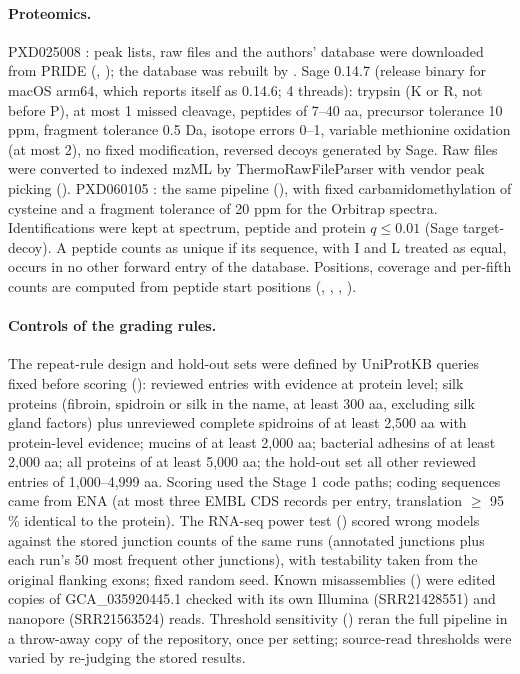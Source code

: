 \documentclass[11pt]{article}
\begin{document}
\paragraph{Proteomics.} PXD025008 \citep{kizina2022}: peak lists, raw files and the authors' database were downloaded
from PRIDE \citep{perezriverol2025} (, ); the database was rebuilt
by . Sage 0.14.7 \citep{lazear2023} (release binary for macOS arm64, which reports itself as
0.14.6; 4 threads): trypsin (K or R, not before P), at most 1 missed cleavage, peptides of 7--40 aa, precursor tolerance
10 ppm, fragment tolerance 0.5 Da, isotope errors 0--1, variable methionine oxidation (at most 2), no fixed modification,
reversed decoys generated by Sage. Raw files were converted to indexed mzML by ThermoRawFileParser \citep{hulstaert2020}
with vendor peak picking (). PXD060105 \citep{voigt2025}: the same pipeline
(), with fixed carbamidomethylation of cysteine and a fragment tolerance of 20 ppm for the Orbitrap
spectra. Identifications were kept at spectrum, peptide and protein $q \leq 0.01$ (Sage target-decoy). A peptide counts as
unique if its sequence, with I and L treated as equal, occurs in no other forward entry of the database. Positions,
coverage and per-fifth counts are computed from peptide start positions (,
, , ).

\paragraph{Controls of the grading rules.} The repeat-rule design and hold-out sets were defined by UniProtKB queries fixed
before scoring (): reviewed entries with evidence at protein level; silk proteins (fibroin, spidroin or silk
in the name, at least 300 aa, excluding silk gland factors) plus unreviewed complete spidroins of at least 2,500 aa with
protein-level evidence; mucins of at least 2,000 aa; bacterial adhesins of at least 2,000 aa; all proteins of at least
5,000 aa; the hold-out set all other reviewed entries of 1,000--4,999 aa. Scoring used the Stage 1 code paths; coding
sequences came from ENA (at most three EMBL CDS records per entry, translation $\geq$ 95\,\% identical to the protein). The
RNA-seq power test () scored wrong models against the stored junction counts of the same runs
(annotated junctions plus each run's 50 most frequent other junctions), with testability taken from the original flanking
exons; fixed random seed. Known misassemblies () were edited copies of GCA\_035920445.1 checked with its
own Illumina (SRR21428551) and nanopore (SRR21563524) reads. Threshold sensitivity () reran the
full pipeline in a throw-away copy of the repository, once per setting; source-read thresholds were varied by re-judging the
stored results.
\end{document}
